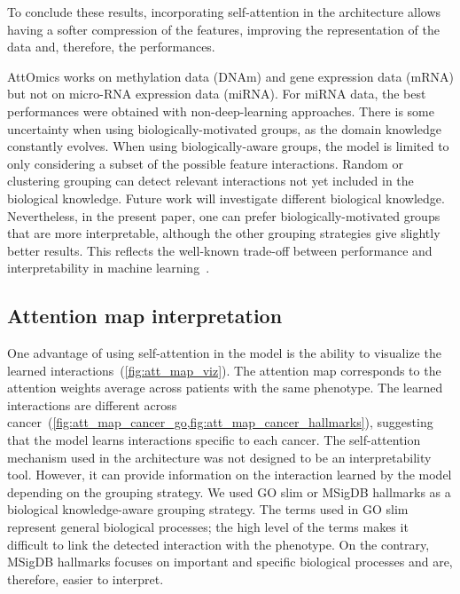 \documentclass[../main.tex]{subfiles}
\begin{document}
	    To conclude these results, incorporating self-attention in the architecture allows having a softer compression of the features, improving the representation of the data and, therefore, the performances.

	    AttOmics works on methylation data (DNAm) and gene expression data (mRNA) but not on micro-RNA expression data (miRNA).
	    For miRNA data, the best performances were obtained with non-deep-learning approaches.
	    There is some uncertainty when using biologically-motivated groups, as the domain knowledge constantly evolves.
	    When using biologically-aware groups, the model is limited to only considering a subset of the possible feature interactions.
	    Random or clustering grouping can detect relevant interactions not yet included in the biological knowledge.
	    Future work will investigate different biological knowledge.
	    Nevertheless, in the present paper, one can prefer biologically-motivated groups that are more interpretable, although the other grouping strategies give slightly better results.
	    This reflects the well-known trade-off between performance and interpretability in machine learning~\cite{Linardatos2021_ExplainableAI}.

	\subsection{Attention map interpretation}

	    One advantage of using self-attention in the model is the ability to visualize the learned interactions~(\cref{fig:att_map_viz}).
	    The attention map corresponds to the attention weights average across patients with the same phenotype.
	    The learned interactions are different across cancer~(\cref{fig:att_map_cancer_go,fig:att_map_cancer_hallmarks}), suggesting that the model learns interactions specific to each cancer.
	    The self-attention mechanism used in the architecture was not designed to be an interpretability tool.
	    However, it can provide information on the interaction learned by the model depending on the grouping strategy.
	    We used GO slim or MSigDB hallmarks as a biological knowledge-aware grouping strategy.
	    The terms used in GO slim represent general biological processes; the high level of the terms makes it difficult to link the detected interaction with the phenotype.
	    On the contrary, MSigDB hallmarks focuses on important and specific biological processes and  are, therefore, easier to interpret.
\end{document}
